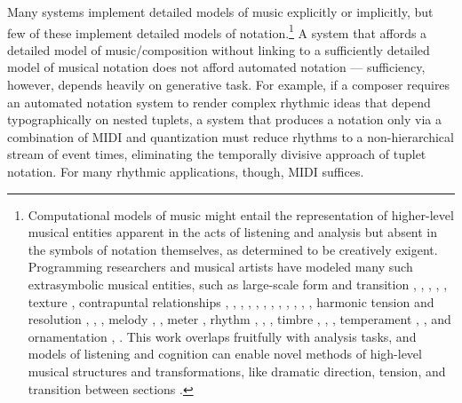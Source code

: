 \documentclass{article}
\begin{document}
Many systems implement detailed models of music explicitly or implicitly, but
few of these implement detailed models of notation.\footnote{Computational
models of music might entail the representation of higher-level musical
entities apparent in the acts of listening and analysis but absent in the
symbols of notation themselves, as determined to be creatively exigent.
Programming researchers and musical artists have modeled many such
extrasymbolic musical entities, such as large-scale form and transition
\cite{polansky1991morphological}, \cite{uno1994temporal},
\cite{dobrian1995algorithmic}, \cite{abrams1999higher}, \cite{Yoo1983}, texture
\cite{Horenstein:2004kx}, contrapuntal relationships \cite{Boenn:2009oq},
\cite{Acevedo2005}, \cite{Anders:2011kl}, \cite{Balser:1990tg},
\cite{Jones:2000hc}, \cite{uno1994temporal}, \cite{Bell:1995ij},
\cite{farbood2001analysis}, \cite{Cope:2002fv}, \cite{Laurson:2005dz},
\cite{Polansky:2011fu}, \cite{Ebcioglu:1980kl}, harmonic tension and resolution
\cite{Melo2003}, \cite{Wiggins1999}, \cite{Foster:1995qa}, melody
\cite{Hornel:1993mi}, \cite{Smith:1992pi}, meter \cite{Hamanaka:2005ff}, rhythm
\cite{Nauert2007}, \cite{Degazio:1996lh}, \cite{Collins:2003bs}, timbre
\cite{Xenakis:1991fu}, \cite{Creasey:1996ye}, \cite{Osaka2004}, temperament
\cite{Seymour:2007qo}, \cite{Graf:2006il}, and ornamentation
\cite{Ariza:2003zt}, \cite{Chico-Topfer:1998jl}. This work overlaps fruitfully
with analysis tasks, and models of listening and cognition can enable novel
methods of high-level musical structures and transformations, like dramatic
direction, tension, and transition between sections \cite[108]{Collins2009}.} A
system that affords a detailed model of music/composition without linking to a
sufficiently detailed model of musical notation does not afford automated
notation --- sufficiency, however, depends heavily on generative task. For
example, if a composer requires an automated notation system to render complex
rhythmic ideas that depend typographically on nested tuplets, a system that
produces a notation only via a combination of MIDI and quantization must reduce
rhythms to a non-hierarchical stream of event times, eliminating the temporally
divisive approach of tuplet notation. For many rhythmic applications, though,
MIDI suffices.
\end{document}
